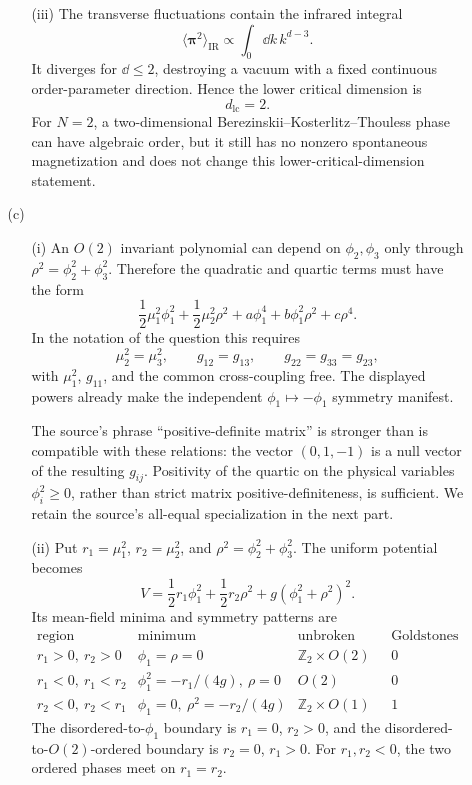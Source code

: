 \begin{enumerate}
\begin{enumerate}
\begin{enumerate}
      \item[(iii)]
      The transverse fluctuations contain the infrared integral
      \[
        \langle\boldsymbol\pi^2\rangle_{\mathrm{IR}}
          \propto\int_0 \dd k\,k^{d-3}.
      \]
      It diverges for \(\dd\leq2\), destroying a vacuum with a fixed
      continuous order-parameter direction.  Hence the lower critical
      dimension is
      \[
        \boxed{d_{\mathrm{lc}}=2.}
      \]
      For \(N=2\), a two-dimensional Berezinskii--Kosterlitz--Thouless phase
      can have algebraic order, but it still has no nonzero spontaneous
      magnetization and does not change this lower-critical-dimension
      statement.
    \end{enumerate}

    \item[(c)]
    \begin{enumerate}
      \item[(i)]
      An \(O(2)\) invariant polynomial can depend on \(\phi_2,\phi_3\) only
      through \(\rho^2=\phi_2^2+\phi_3^2\).  Therefore the quadratic and
      quartic terms must have the form
      \[
        \frac12\mu_1^2\phi_1^2+\frac12\mu_2^2\rho^2
          +a\phi_1^4+b\phi_1^2\rho^2+c\rho^4.
      \]
      In the notation of the question this requires
      \[
        \boxed{\mu_2^2=\mu_3^2,\qquad
          g_{12}=g_{13},\qquad g_{22}=g_{33}=g_{23},}
      \]
      with \(\mu_1^2\), \(g_{11}\), and the common cross-coupling free.
      The displayed powers already make the independent
      \(\phi_1\mapsto-\phi_1\) symmetry manifest.

      The source's phrase ``positive-definite matrix'' is stronger than is
      compatible with these relations: the vector \((0,1,-1)\) is a null
      vector of the resulting \(g_{ij}\).  Positivity of the quartic on the
      physical variables \(\phi_i^2\geq0\), rather than strict matrix
      positive-definiteness, is sufficient.  We retain the source's
      all-equal specialization in the next part.

      \item[(ii)]
      Put \(r_1=\mu_1^2\), \(r_2=\mu_2^2\), and
      \(\rho^2=\phi_2^2+\phi_3^2\).  The uniform potential becomes
      \[
        V=\frac12r_1\phi_1^2+\frac12r_2\rho^2
          +g(\phi_1^2+\rho^2)^2.
      \]
      Its mean-field minima and symmetry patterns are
      \[
      \begin{array}{c|c|c|c}
        \text{region}&\text{minimum}&\text{unbroken subgroup}
          &\text{Goldstones}\\ \hline
        r_1>0,\ r_2>0
          &\phi_1=\rho=0&\mathbb Z_2\times O(2)&0\\
        r_1<0,\ r_1<r_2
          &\phi_1^2=-r_1/(4g),\ \rho=0&O(2)&0\\
        r_2<0,\ r_2<r_1
          &\phi_1=0,\ \rho^2=-r_2/(4g)
          &\mathbb Z_2\times O(1)&1
      \end{array}
      \]
      The disordered-to-\(\phi_1\) boundary is \(r_1=0\), \(r_2>0\), and
      the disordered-to-\(O(2)\)-ordered boundary is
      \(r_2=0\), \(r_1>0\).  For \(r_1,r_2<0\), the two ordered phases meet
      on \(r_1=r_2\).


\end{enumerate}
\end{enumerate}
\end{enumerate}
